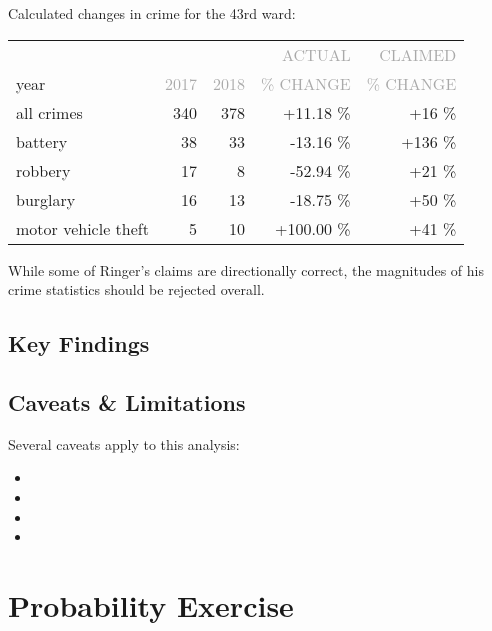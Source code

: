 \documentclass[11pt]{article}
\newcommand{\printsubsection}[1]{\normalfont\headerfontlt\textcolor{darkgray}{{#1}}}
\newcommand{\opns}[1]{\textrm{\small\printsubsection{\MakeUppercase{#1}}}}
\begin{document}
Calculated changes in crime for the 43rd ward:
\begin{table}[H]
\centering \renewcommand{\arraystretch}{1.2}
\begin{tabular}{lrrrr}
\multicolumn{1}{l|}{} & & & \opns{ACTUAL} & \opns{CLAIMED} \\
\multicolumn{1}{l|}{year} &    \opns{2017} &    \opns{2018} &     \opns{\% CHANGE} &     \opns{\% CHANGE} \\\hline
\multicolumn{1}{l|}{all crimes}          &  340  &  378   &  +11.18 \% & +16  \% \\
\multicolumn{1}{l|}{battery}             &    38 &    33  & -13.16  \% & +136 \% \\
\multicolumn{1}{l|}{robbery}             &    17 &     8  & -52.94  \% & +21  \% \\
\multicolumn{1}{l|}{burglary}            &    16 &    13  & -18.75  \% & +50  \% \\
\multicolumn{1}{l|}{motor vehicle theft} &     5 &    10  & +100.00 \% & +41  \% \\
\end{tabular}
\end{table}
While some of Ringer's claims are directionally correct, the magnitudes of his crime statistics should be rejected overall.

\subsection{Key Findings}

\subsection{Caveats \& Limitations}
Several caveats apply to this analysis:
\begin{itemize}
\item 
\item 
\item 
\item 
\end{itemize}
\pagebreak
\section{Probability Exercise}
\end{document}
